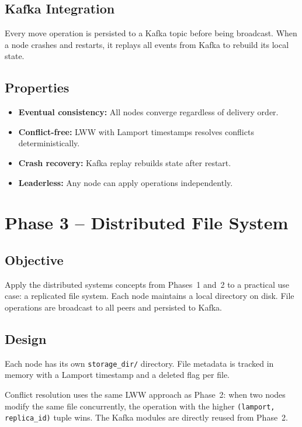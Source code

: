 \documentclass[12pt, a4paper]{article}
\begin{document}
\subsection{Kafka Integration}

Every move operation is persisted to a Kafka topic before being broadcast. When a node crashes and restarts, it replays all events from Kafka to rebuild its local state.

\subsection{Properties}

\begin{itemize}
    \item \textbf{Eventual consistency:} All nodes converge regardless of delivery order.
    \item \textbf{Conflict-free:} LWW with Lamport timestamps resolves conflicts deterministically.
    \item \textbf{Crash recovery:} Kafka replay rebuilds state after restart.
    \item \textbf{Leaderless:} Any node can apply operations independently.
\end{itemize}

\section{Phase 3 -- Distributed File System}

\subsection{Objective}

Apply the distributed systems concepts from Phases~1 and~2 to a practical use case: a replicated file system. Each node maintains a local directory on disk. File operations are broadcast to all peers and persisted to Kafka.

\subsection{Design}

Each node has its own \texttt{storage\_dir/} directory. File metadata is tracked in memory with a Lamport timestamp and a deleted flag per file.

Conflict resolution uses the same LWW approach as Phase~2: when two nodes modify the same file concurrently, the operation with the higher \texttt{(lamport, replica\_id)} tuple wins. The Kafka modules are directly reused from Phase~2.
\end{document}
